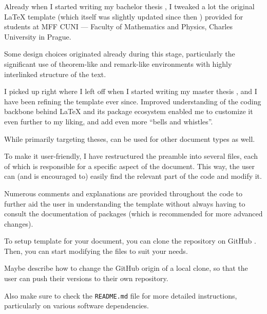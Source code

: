  \label{ch:Introduction}

Already when I started writing my bachelor thesis \autocite{Dujava2022}, I tweaked a lot the original \LaTeX{} template (which itself was slightly updated since then \autocite{MaresTemplate}) provided for students at MFF CUNI --- Faculty of Mathematics and Physics, Charles University in Prague.

Some design choices originated already during this stage, particularly the significant use of theorem-like and remark-like environments with highly interlinked structure of the text.

I picked up right where I left off when I started writing my master thesis \autocite{TODO}, and I have been refining the template ever since.
Improved understanding of the coding backbone behind \LaTeX{} and its package ecosystem enabled me to customize it even further to my liking, and add even more \enquote{bells and whistles}.

\begin{remark}
    While primarily targeting theses, \TeXtured{} can be used for other document types as well.
\end{remark}

To make it user-friendly, I have restructured the preamble into several files, each of which is responsible for a specific aspect of the document.
This way, the user can (and is encouraged to) easily find the relevant part of the code and modify it.

Numerous comments and explanations are provided throughout the code to further aid the user in understanding the template without always having to consult the documentation of packages (which is recommended for more advanced changes).

\begin{remark}
    To setup \TeXtured{} template for your document, you can clone the repository on GitHub \autocite{TODO}.
    Then, you can start modifying the files to suit your needs.
    \begin{Todo}
        Maybe describe how to change the GitHub origin of a local clone, so that the user can push their versions to their own repository.
    \end{Todo}
    Also make sure to check the \texttt{README.md} file for more detailed instructions, particularly on various software dependencies.
\end{remark}

